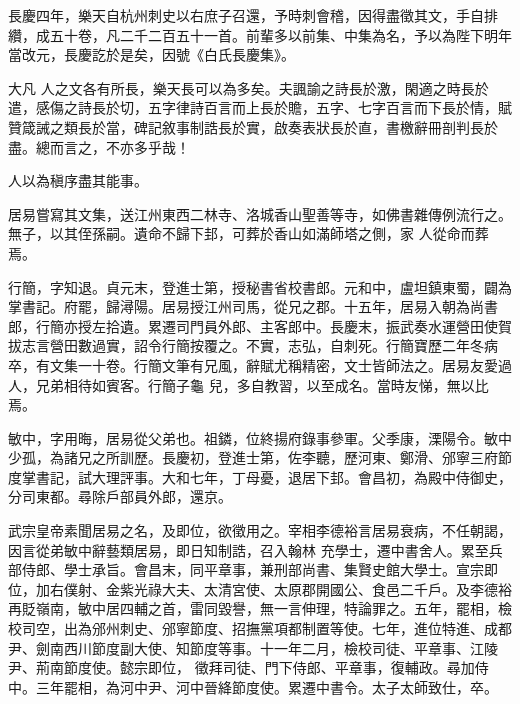 \begin{pinyinscope}
 長慶四年，樂天自杭州刺史以右庶子召還，予時刺會稽，因得盡徵其文，手自排纘，成五十卷，凡二千二百五十一首。前輩多以前集、中集為名，予以為陛下明年當改元，長慶訖於是矣，因號《白氏長慶集》。



 大凡
 人之文各有所長，樂天長可以為多矣。夫諷諭之詩長於激，閑適之時長於遣，感傷之詩長於切，五字律詩百言而上長於贍，五字、七字百言而下長於情，賦贊箴誡之類長於當，碑記敘事制誥長於實，啟奏表狀長於直，書檄辭冊剖判長於盡。總而言之，不亦多乎哉！



 人以為稹序盡其能事。



 居易嘗寫其文集，送江州東西二林寺、洛城香山聖善等寺，如佛書雜傳例流行之。無子，以其侄孫嗣。遺命不歸下邽，可葬於香山如滿師塔之側，家
 人從命而葬焉。



 行簡，字知退。貞元末，登進士第，授秘書省校書郎。元和中，盧坦鎮東蜀，闢為掌書記。府罷，歸潯陽。居易授江州司馬，從兄之郡。十五年，居易入朝為尚書郎，行簡亦授左拾遺。累遷司門員外郎、主客郎中。長慶末，振武奏水運營田使賀拔志言營田數過實，詔令行簡按覆之。不實，志弘，自刺死。行簡寶歷二年冬病卒，有文集一十卷。行簡文筆有兄風，辭賦尤稱精密，文士皆師法之。居易友愛過人，兄弟相待如賓客。行簡子龜
 兒，多自教習，以至成名。當時友悌，無以比焉。



 敏中，字用晦，居易從父弟也。祖鏻，位終揚府錄事參軍。父季康，溧陽令。敏中少孤，為諸兄之所訓歷。長慶初，登進士第，佐李聽，歷河東、鄭滑、邠寧三府節度掌書記，試大理評事。大和七年，丁母憂，退居下邽。會昌初，為殿中侍御史，分司東都。尋除戶部員外郎，還京。



 武宗皇帝素聞居易之名，及即位，欲徵用之。宰相李德裕言居易衰病，不任朝謁，因言從弟敏中辭藝類居易，即日知制誥，召入翰林
 充學士，遷中書舍人。累至兵部侍郎、學士承旨。會昌末，同平章事，兼刑部尚書、集賢史館大學士。宣宗即位，加右僕射、金紫光祿大夫、太清宮使、太原郡開國公、食邑二千戶。及李德裕再貶嶺南，敏中居四輔之首，雷同毀譽，無一言伸理，特論罪之。五年，罷相，檢校司空，出為邠州刺史、邠寧節度、招撫黨項都制置等使。七年，進位特進、成都尹、劍南西川節度副大使、知節度等事。十一年二月，檢校司徒、平章事、江陵尹、荊南節度使。懿宗即位，
 徵拜司徒、門下侍郎、平章事，復輔政。尋加侍中。三年罷相，為河中尹、河中晉絳節度使。累遷中書令。太子太師致仕，卒。




\end{pinyinscope}

